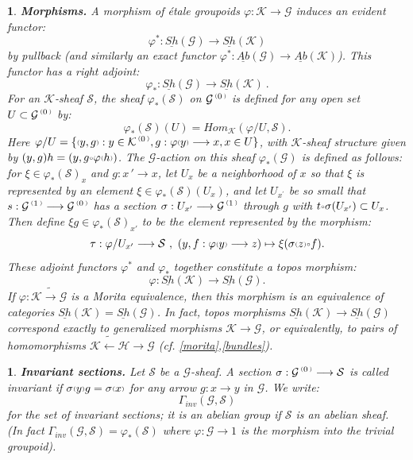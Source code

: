 \documentclass[a4paper]{article}
\newtheorem{num}[st]{}
\newcommand{\f}{\ensuremath{\varphi}}
\newcommand{\rmap}{\longrightarrow}
\newcommand{\lmap}{\longleftarrow}
\newcommand{\Ka}{\ensuremath{\mathcal{K}}}
\newcommand{\Ha}{\ensuremath{\mathcal{H}}}
\newcommand{\G}{\ensuremath{\mathcal{G}}}
\newcommand{\es}{\ensuremath{\mathcal{S}}}
\newcommand{\shG}{\ensuremath{\underline{Sh}(\G)}}
\newcommand{\abG}{\ensuremath{\underline{Ab}(\G)}}
\newcommand{\shK}{\ensuremath{\underline{Sh}(\Ka)}}
\newcommand{\abK}{\ensuremath{\underline{Ab}(\Ka)}}
\newcommand{\ps}{{\raise 1pt\hbox{\tiny (}}}
\newcommand{\pd}{{\raise 1pt\hbox{\tiny )}}}
\newcommand{\nG}[1]{\ensuremath{\G^{\,\ps #1\,\pd}}}
\newcommand{\nK}[1]{\ensuremath{\Ka^{\,\ps #1\,\pd}}}
\def\compose{{\raise 1pt\hbox{$\scriptscriptstyle\circ$}}}
\begin{document}
\begin{num}
\label{morph}
\emph{
{\bf Morphisms.} A morphism of \'etale groupoids $\f :\Ka \rmap \G$ induces an evident functor:
\[ \f^{*} : \shG \rmap \shK \]
by pullback (and similarly an exact functor $\f^{*} : \abG \rmap \abK$). This functor has a right adjoint:
\[ \f_{*}: \shG \rmap \shK\ .\]
For an $\Ka$-sheaf $\es$, the sheaf $\f_{*}(\es)$ on $\nG{0}$ is defined for any open set $U \subset \nG{0}$ by:
\[ \f_{*}(\es) (U)= Hom_{\Ka}( \f/U, \es) .\]
Here $\f/U= \{ \ps y, g\pd : y \in \nK{0}, g: \f\ps y\pd \rmap x, x\in U \}$, with $\Ka$-sheaf structure given by $( y, g) h = ( y, g\compose \f\ps h\pd )$. The $\G$-action on this sheaf $\f_{*}(\G)$ is defined as follows: for $\xi \in \f_{*}(\es)_{x}$ and $g: x\,' \rmap x$, let $U_{x}$ be a neighborhood of $x$ so that $\xi$ is represented by an element $\xi \in \f_{*}(\es)(U_{x})$, and let $U_{x^{'}}$ be so small that $s: \nG{1} \rmap \nG{0}$ has a section $\sigma : U_{x'} \rmap \nG{1}$ through $g$ with $t \compose \sigma(U_{x'}) \subset U_{x}$. Then define $\xi g\in \f_{*}(\es)_{x'}$ to be the element represented by the morphism:
\[ \tau : \f/U_{x'} \rmap \es \ , \ (y, f: \f\ps y\pd \rmap z) \mapsto \xi(\sigma\ps z\pd \compose f). \]
These adjoint functors $\f^{*}$ and $\f_{*}$ together constitute a topos morphism:
\[ \f : \shK \rmap \shG .\]
If $\f: \Ka \tilde{\rmap} \G$ is a Morita equivalence, then this morphism is an equivalence of categories $\shK = \shG$. In fact, topos morphisms $\shK \rmap \shG$ correspond exactly to generalized morphisms $\Ka \rmap \G$, or equivalently, to pairs of homomorphisms $\Ka \tilde{\lmap}   \Ha \rmap \G$ (cf. \ref{morita},\ref{bundles}).
}
\end{num}





\begin{num}
\emph{
{\bf Invariant sections.} Let $\es$ be a $\G$-sheaf. A section $\sigma: \nG{0} \rmap \es$ is called invariant if $\sigma\ps y\pd g= \sigma\ps x\pd$ for any arrow $g: x\rmap y$ in $\G$. We write:
\[ \Gamma_{inv}(\G, \es) \]
for the set of invariant sections; it is an abelian group if $\es$ is an abelian sheaf. (In fact $\Gamma_{inv}(\G, \es)= \f_{*}(\es)$ where $\f: \G \rmap 1$ is the morphism into the trivial groupoid).
}
\end{num}
\end{document}
